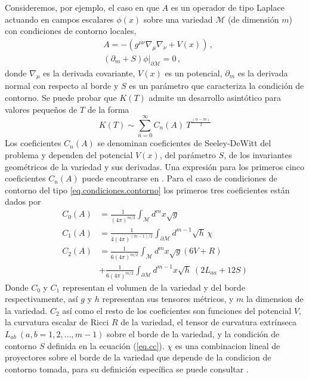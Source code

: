 Consideremos, por ejemplo, el caso en que $A$ es un operador de tipo Laplace actuando en campos escalares $\phi(x)$ sobre una variedad $\mathcal{M}$  (de dimensión $m$) con condiciones de contorno locales,
\begin{align}\label{eq.cc}
&A = - \left(
			g ^{\mu \nu} \nabla _{\mu} \nabla _{\nu} + V(x)	\right) \,,\\[2mm]
\label{eq.condiciones.contorno}						
&\left (\partial _m + S \right) \phi | _{\partial \mathcal{M}} = 0\,,
\end{align}
donde $\nabla _{\mu}$ es la derivada covariante, $V(x)$ es un potencial, $\partial _m$ es la derivada normal con respecto al borde y $S$ es un parámetro que caracteriza la condición de contorno. Se puede probar \cite{10.2307/2373309,10.2307/2373078} que $K(T)$ admite un desarrollo asintótico para valores pequeños de $T$  de la forma
\begin{equation}
K(T) \sim 
\sum _{n=0} ^{\infty}
C _n (A) \ 
T^{\frac{(n-m)}{2}} 
\label{eq.heat.expansion}
\end{equation}
Los coeficientes $C_n(A)$ se denominan coeficientes de Seeley-DeWitt del problema y dependen del potencial $V(x)$, del parámetro $S$, de los invariantes geométricos de la variedad y sus derivadas. Una expresión para los primeros cinco coeficientes $C _n (A) $ puede encontrarse en \cite{Vassilevich:2003xt}. Para el caso de condiciones de contorno del tipo \ref{eq.condiciones.contorno} los primeros tres coeficientes están dados por
\begin{align}
\label{C_0}
C _0 (A) &= \frac{1}{(4 \pi ) ^{m/2} }  \int  _{\mathcal{M}} d ^m x \sqrt{g}  \\[2mm]
C _1 (A) &= \frac{ 1 }{4 (4 \pi ) ^{(m-1)/2} } \int _{\partial \mathcal{M} } d ^{m-1} \sqrt{h} 
\, \chi
\label{C _1}
\\[2mm]
C _2 (A) &= \frac{ 1 }{6 (4 \pi) ^{m/2} } 
					\int _{\mathcal{M}} d ^m x\sqrt{g} (6 V + R)  
\nonumber
					\\
& + \frac{ 1 }{6 (4 \pi) ^{m/2} } 
					\int _{\partial \mathcal{M} } d ^{m-1} x 
				\sqrt{h} \ ( 2 L _{aa} + 12 S )
\label{coef}
\end{align} 
Donde $C _0$ y $C _1$ representan el volumen de la variedad y del borde respectivamente, así $g$ y $h$ representan sus tensores métricos, y $m$ la dimension de la variedad. $C _2$ así como el resto de los coeficientes son funciones del potencial $V$, la curvatura escalar de Ricci $R$ de la variedad, el tensor de curvatura extrínseca $L _{ab } \ (a,b = 1,2,...,m-1)$ sobre el borde de la variedad, y la condición de contorno $S$ definida en la ecuación (\ref{eq.cc}). $\chi$ es una combinacion lineal de proyectores sobre el borde de la variedad que depende de la condicion de contorno tomada, para su definición específica se puede consultar \cite{Vassilevich:2003xt}.



